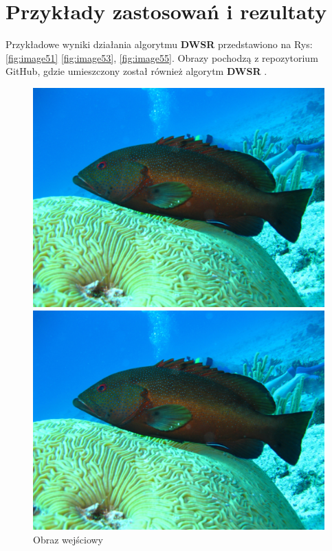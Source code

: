 \section{Przykłady zastosowań i rezultaty}



Przykładowe wyniki działania algorytmu \textbf{DWSR} przedstawiono na Rys: \ref{fig:image51} \ref{fig:image53}, \ref{fig:image55}. Obrazy pochodzą z repozytorium GitHub, gdzie umieszczony został również algorytm \textbf{DWSR} \cite{guo2017deep}.

\begin{figure}[ht]
    \centering
    \begin{minipage}[t]{0.45\linewidth}
        \includegraphics[width=\linewidth]{Rozdziały/03.DWSR/Obrazy/0904x4.png}
        \caption{Obraz wejściowy}
        \label{fig:image50}
    \end{minipage}
    \hspace{0.5cm}
    \begin{minipage}[t]{0.45\linewidth}
        \includegraphics[width=\linewidth]{Rozdziały/03.DWSR/Obrazy/0904x4_DWSRx4.png}

\end{minipage}
\end{figure}
